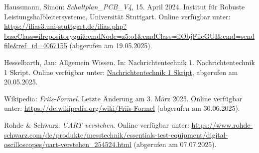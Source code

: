 \begin{thebibliography}{1}

Haussmann, Simon: \emph{Schaltplan\_PCB\_V4}, 15. April 2024. Institut für Robuste Leistungshalbleitersysteme, Universität Stuttgart. Online verfügbar unter: \url{https://ilias3.uni-stuttgart.de/ilias.php?baseClass=ilrepositorygui&cmdNode=z5:o1&cmdClass=ilObjFileGUI&cmd=sendfile&ref_id=4067155} (abgerufen am 19.05.2025).

Hesselbarth, Jan: Allgemein Wissen. In: Nachrichtentechnik 1. Nachrichtentechnik 1 Skript. Online verfügbar unter: \url{Nachrichtentechnik 1 Skript}, abgerufen am 20.05.2025.

Wikipedia: \emph{Friis-Formel}. Letzte Änderung am 3. März 2025.  
Online verfügbar unter: \url{https://de.wikipedia.org/wiki/Friis-Formel} (abgerufen am 30.06.2025).

Rohde \& Schwarz: \emph{UART verstehen}.  Online verfügbar unter: \url{https://www.rohde-schwarz.com/de/produkte/messtechnik/essentials-test-equipment/digital-oscilloscopes/uart-verstehen_254524.html} (abgerufen am 07.07.2025).

\end{thebibliography}

\clearpage
